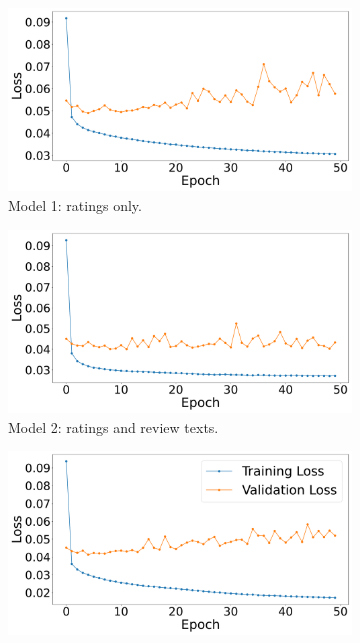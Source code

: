 \begin{figure}[h]
    \centering
    \begin{subfigure}{0.49\textwidth}
        \centering
        \includegraphics[width=\linewidth]{Figures/ncf_training_1_sample.pdf} %
        \caption{Model 1: ratings only.}
        \label{fig:model1_sample} 
    \end{subfigure}
    \hfill
    \begin{subfigure}{0.49\textwidth}
        \centering
        \includegraphics[width=\linewidth]{Figures/ncf_training_2_sample.pdf} %
        \caption{Model 2: ratings and review texts.}
        \label{fig:model2_sample}
    \end{subfigure}
    \hfill
    \begin{subfigure}{0.49\textwidth}
        \centering
        \includegraphics[width=\linewidth]{Figures/ncf_training_3_sample.pdf} %

\end{subfigure}
\end{figure}
